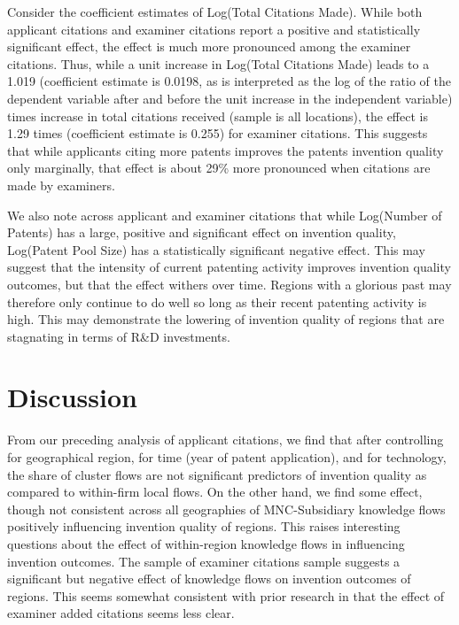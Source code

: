\documentclass[12pt,letterpaper]{article}
\begin{document}
Consider the coefficient estimates of Log(Total Citations Made). While both applicant citations and examiner citations report a positive and statistically significant effect, the effect is much more pronounced among the examiner citations. Thus, while a unit increase in Log(Total Citations Made) leads to a 1.019 (coefficient estimate is 0.0198, as is interpreted as the log of the ratio of the dependent variable after and before the unit increase in the independent variable) times increase in total citations received (sample is all locations), the effect is 1.29 times (coefficient estimate is 0.255) for examiner citations. This suggests that while applicants citing more patents improves the patent\textquotesingle s invention quality only marginally, that effect is about 29\% more pronounced when citations are made by examiners.

We also note across applicant and examiner citations that while Log(Number of Patents) has a large, positive and significant effect on invention quality, Log(Patent Pool Size) has a statistically significant negative effect. This may suggest that the intensity of current patenting activity improves invention quality outcomes, but that the effect withers over time. Regions with a glorious past may therefore only continue to do well so long as their recent patenting activity is high. This may demonstrate the lowering of invention quality of regions that are stagnating in terms of R\&D investments.

\section*{Discussion}
From our preceding analysis of applicant citations, we find that after controlling for geographical region, for time (year of patent application), and for technology, the share of cluster flows are not significant predictors of invention quality as compared to within-firm local flows. On the other hand, we find some effect, though not consistent across all geographies of MNC-Subsidiary knowledge flows positively influencing invention quality of regions. This raises interesting questions about the effect of within-region knowledge flows in influencing invention outcomes. The sample of examiner citations sample suggests a significant but negative effect of knowledge flows on invention outcomes of regions. This seems somewhat consistent with prior research \citep{Alcacer2006a} in that the effect of examiner added citations seems less clear. \par
\end{document}

